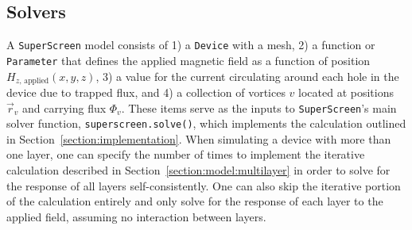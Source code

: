 \documentclass[final,3p,times]{elsarticle}
\newcommand{\inline}[1]{\texttt{#1}\xspace}
\newcommand{\SuperScreen}{\inline{SuperScreen}}
\newenvironment{code}{\captionsetup{type=listing}}{\hfill}
\begin{document}
\subsection{Solvers}
\label{section:overview:solvers}

A \SuperScreen model consists of 1) a \inline{Device} with a mesh, 2) a function or \inline{Parameter} that defines the applied magnetic field as a function of position $H_{z,\,\mathrm{applied}}(x, y, z)$, 3) a value for the current circulating around each hole in the device due to trapped flux, and 4) a collection of vortices $v$ located at positions $\vec{r}_v$ and carrying flux $\Phi_v$. These items serve as the inputs to \SuperScreen's main solver function, \inline{superscreen.solve()}, which implements the calculation outlined in Section~\ref{section:implementation}. When simulating a device with more than one layer, one can specify the number of times to implement the iterative calculation described in Section~\ref{section:model:multilayer} in order to solve for the response of all layers self-consistently. One can also skip the iterative portion of the calculation entirely and only solve for the response of each layer to the applied field, assuming no interaction between layers.




\end{document}
